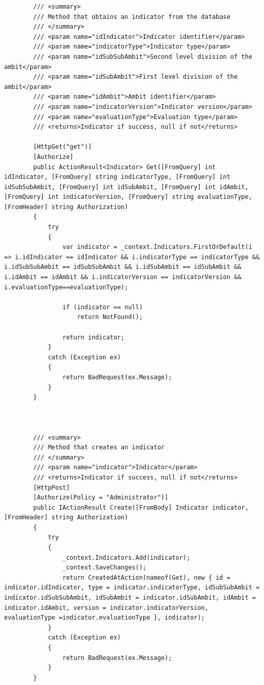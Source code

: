 \begin{itemize}
\begin{itemize}
\begin{lstlisting}
        /// <summary>
        /// Method that obtains an indicator from the database
        /// </summary>
        /// <param name="idIndicator">Indicator identifier</param>
        /// <param name="indicatorType">Indicator type</param>
        /// <param name="idSubSubAmbit">Second level division of the ambit</param>
        /// <param name="idSubAmbit">First level division of the ambit</param>
        /// <param name="idAmbit">Ambit identifier</param>
        /// <param name="indicatorVersion">Indicator version</param>
        /// <param name="evaluationType">Evaluation type</param>
        /// <returns>Indicator if success, null if not</returns>

        [HttpGet("get")]
        [Authorize]
        public ActionResult<Indicator> Get([FromQuery] int idIndicator, [FromQuery] string indicatorType, [FromQuery] int idSubSubAmbit, [FromQuery] int idSubAmbit, [FromQuery] int idAmbit, [FromQuery] int indicatorVersion, [FromQuery] string evaluationType, [FromHeader] string Authorization)
        {
            try
            {
                var indicator = _context.Indicators.FirstOrDefault(i => i.idIndicator == idIndicator && i.indicatorType == indicatorType && i.idSubSubAmbit == idSubSubAmbit && i.idSubAmbit == idSubAmbit && i.idAmbit == idAmbit && i.indicatorVersion == indicatorVersion && i.evaluationType==evaluationType);

                if (indicator == null)
                    return NotFound();

                return indicator;
            }
            catch (Exception ex)
            {
                return BadRequest(ex.Message);
            }
        }



        /// <summary>
        /// Method that creates an indicator
        /// </summary>
        /// <param name="indicator">Indicator</param>
        /// <returns>Indicator if success, null if not</returns>
        [HttpPost]
        [Authorize(Policy = "Administrator")]
        public IActionResult Create([FromBody] Indicator indicator, [FromHeader] string Authorization)
        {
            try
            {
                _context.Indicators.Add(indicator);
                _context.SaveChanges();
                return CreatedAtAction(nameof(Get), new { id = indicator.idIndicator, type = indicator.indicatorType, idSubSubAmbit = indicator.idSubSubAmbit, idSubAmbit = indicator.idSubAmbit, idAmbit = indicator.idAmbit, version = indicator.indicatorVersion, evaluationType =indicator.evaluationType }, indicator);
            }
            catch (Exception ex)
            {
                return BadRequest(ex.Message);
            }
        }


\end{lstlisting}
\end{itemize}
\end{itemize}
